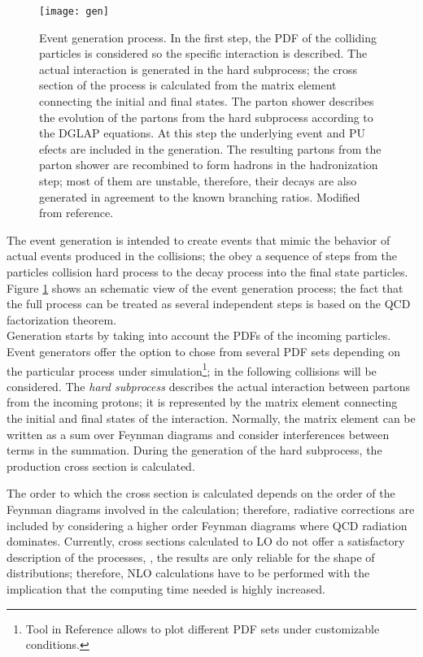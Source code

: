 \begin{figure}[!h]
  \centering
  \texttt{[image: gen]}
  \caption[Event generation process.]{Event generation process. In the first step, the PDF of the colliding particles is considered so the specific interaction is described. The actual interaction is generated in the hard subprocess; the cross section of the process is calculated from the matrix element connecting the initial and final states. The parton shower describes the evolution of the partons from the hard subprocess according to the DGLAP equations. At this step the underlying event and PU efects are included in the generation. The resulting partons from the parton shower are recombined to form hadrons in the hadronization step; most of them are unstable, therefore, their decays are also generated in agreement to the known branching ratios. Modified from reference\cite{gen_scheme}.}\label{fig:gen}
\end{figure}

\noindent The event generation is intended to create events that mimic the behavior of actual events produced in the collisions; the obey a sequence of steps from the particles collision hard process to the decay process into the final state particles. Figure \ref{fig:gen} shows an schematic view of the event generation process; the fact that the full process can be treated as several independent steps is based on the QCD factorization theorem.\\     

\noindent Generation starts by taking into account the PDFs of the incoming particles. Event generators offer the option to chose from several PDF sets depending on the particular process under simulation\footnote{Tool in Reference \cite{pdfplot} allows to plot different PDF sets under customizable conditions.}; in the following \pp collisions will be considered. The \textit{hard subprocess} describes the actual interaction between partons from the incoming protons; it is represented by the matrix element connecting the initial and final states of the interaction. Normally, the matrix element can be written as a sum over Feynman diagrams and consider interferences between terms in the summation. During the generation of the hard subprocess, the production cross section is calculated. 

\noindent The order to which the cross section is calculated depends on the order of the Feynman diagrams involved in the calculation; therefore, radiative corrections are included by considering a higher order Feynman diagrams where QCD radiation dominates. Currently, cross sections calculated to LO do not offer a satisfactory description of the processes, \ie, the results are only reliable for the shape of distributions; therefore, NLO calculations have to be performed with the implication that the computing time needed is highly increased.\\       

